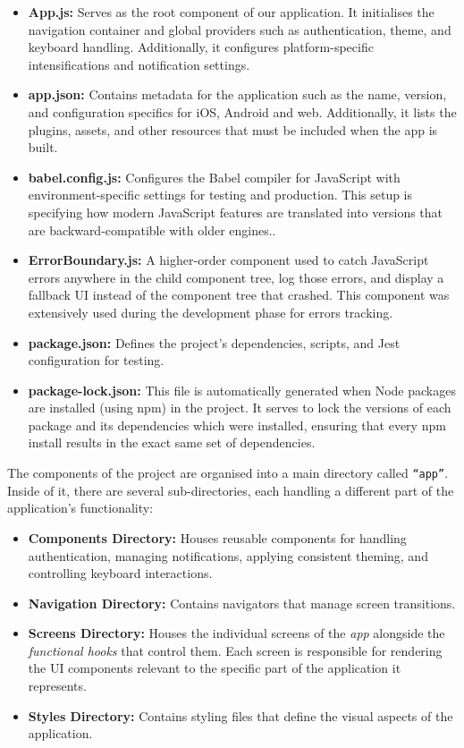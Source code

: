 \begin{itemize}
    \item \textbf{App.js:} Serves as the root component of our application. It initialises the navigation container and global providers such as authentication, theme, and keyboard handling. Additionally, it configures platform-specific intensifications and notification settings.
    \item \textbf{app.json:} Contains metadata for the application such as the name, version, and configuration specifics for iOS, Android and web. Additionally, it lists the plugins, assets, and other resources that must be included when the app is built.
    \item \textbf{babel.config.js:} Configures the Babel compiler for JavaScript with environment-specific settings for testing and production. This setup is specifying how modern JavaScript features are translated into versions that are backward-compatible with older engines..
    \item \textbf{ErrorBoundary.js:} A higher-order component used to catch JavaScript errors anywhere in the child component tree, log those errors, and display a fallback UI instead of the component tree that crashed. This component was extensively used during the development phase for errors tracking.
    \item \textbf{package.json:} Defines the project’s dependencies, scripts, and Jest configuration for testing.
    \item \textbf{package-lock.json:} This file is automatically generated when Node packages are installed (using npm) in the project. It serves to lock the versions of each package and its dependencies which were installed, ensuring that every npm install results in the exact same set of dependencies.
\end{itemize}

The components of the project are organised into a main directory called \texttt{``app''}. Inside of it, there are several sub-directories, each handling a different part of the application's functionality:

\begin{itemize}
    \item \textbf{Components Directory:} Houses reusable components for handling authentication, managing notifications, applying consistent theming, and controlling keyboard interactions.
    \item \textbf{Navigation Directory:} Contains navigators that manage screen transitions.
    \item \textbf{Screens Directory:} Houses the individual screens of the \textit{app} alongside the \textit{functional hooks} that control them. Each screen is responsible for rendering the UI components relevant to the specific part of the application it represents.
    \item \textbf{Styles Directory:} Contains styling files that define the visual aspects of the application.
\end{itemize}

